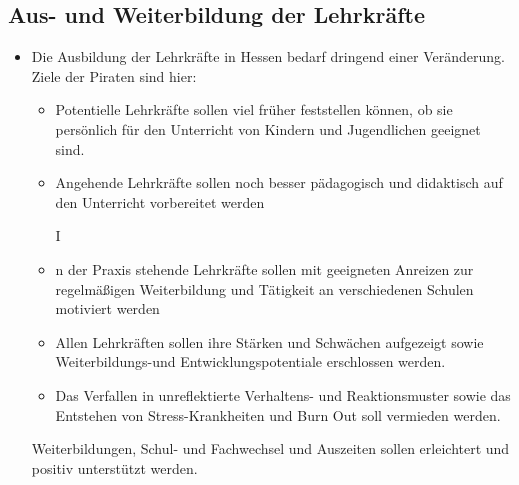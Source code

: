 \documentclass[10pt,a4paper,twocolumn,twoside,titlepage]{article}
\begin{document}
\subsection{Aus- und Weiterbildung der Lehrkräfte}
\begin{itemize}
\item Die Ausbildung der Lehrkräfte in Hessen bedarf dringend einer Veränderung. Ziele der Piraten sind hier:

\begin{itemize}
\item Potentielle Lehrkräfte sollen viel früher feststellen können, ob sie persönlich für den Unterricht von Kindern und Jugendlichen geeignet sind.

\item Angehende Lehrkräfte sollen noch besser pädagogisch und didaktisch auf den Unterricht vorbereitet werden

I\item n der Praxis stehende Lehrkräfte sollen mit geeigneten Anreizen zur regelmäßigen Weiterbildung und Tätigkeit an verschiedenen Schulen motiviert werden

\item Allen Lehrkräften sollen ihre Stärken und Schwächen aufgezeigt sowie Weiterbildungs-und Entwicklungspotentiale erschlossen werden.

\item Das Verfallen in unreflektierte Verhaltens- und Reaktionsmuster sowie das Entstehen von Stress-Krankheiten und Burn Out soll vermieden werden.
\end{itemize}


Weiterbildungen, Schul- und Fachwechsel und Auszeiten sollen erleichtert und positiv unterstützt werden.
\end{itemize}

\

\printindex
\end{document}
